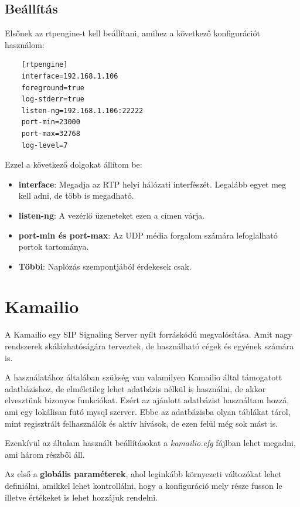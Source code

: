 \subsection{Beállítás}

Elsőnek az rtpengine-t kell beállítani, amihez a következő konfigurációt 
használom: 

\begin{lstlisting}
	[rtpengine]
	interface=192.168.1.106
	foreground=true
	log-stderr=true
	listen-ng=192.168.1.106:22222
	port-min=23000
	port-max=32768
	log-level=7
\end{lstlisting}

Ezzel a következő dolgokat állítom be: 

\begin{itemize}
	\item \textbf{interface}: Megadja az RTP helyi hálózati interfészét. Legalább
	egyet meg kell adni, de több is megadható.
	\item \textbf{listen-ng}: A vezérlő üzeneteket ezen a címen várja. 
	\item \textbf{port-min és port-max}: Az UDP média forgalom számára lefoglalható
	portok tartománya. 
	\item \textbf{Többi}: Naplózás szempontjából érdekesek csak. 
\end{itemize}

\section{Kamailio}

A Kamailio egy SIP Signaling Server nyílt forráskódú megvalósítása. Amit nagy rendszerek
skálázhatóságára terveztek, de használható cégek és egyének számára is.

A használatához általában szükség van valamilyen Kamailio által támogatott adatbázishoz,
de elméletileg lehet adatbázis nélkül is használni, de akkor elvesztünk bizonyos funkciókat. 
Ezért az ajánlott adatbázist használtam hozzá, ami egy lokálisan futó mysql szerver. Ebbe 
az adatbázisba olyan táblákat tárol, mint regisztrált felhasználók és aktív hívások, de 
ezen felül még sok mást is. 

Ezenkívül az általam használt beállításokat a \textit{kamailio.cfg} fájlban lehet megadni,
ami három részből áll. 

Az első a \textbf{globális paraméterek}, ahol leginkább környezeti változókat lehet 
definiálni, amikkel lehet kontrollálni, hogy a konfiguráció mely része fusson le illetve
értékeket is lehet hozzájuk rendelni. 

